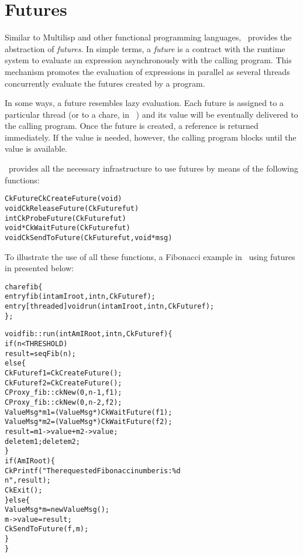 \section{Futures}
\label{futures}

Similar to Multilisp and other functional programming languages, \charmpp\ provides the abstraction of {\em futures}. In simple terms, a {\em future} is a contract with the runtime system to evaluate an expression asynchronously with the calling program. This mechanism promotes the evaluation of expressions in parallel as several threads concurrently evaluate the futures created by a program.

In some ways, a future resembles lazy evaluation. Each future is assigned to a particular thread (or to a chare, in \charmpp\ ) and its value will be eventually delivered to the calling program. Once the future is created, a reference is returned immediately. If the value is needed, however, the calling program blocks until the value is available.

\charmpp\ provides all the necessary infrastructure to use futures by means of the following functions: 

\begin{alltt}
 CkFuture CkCreateFuture(void)
 void CkReleaseFuture(CkFuture fut)
 int CkProbeFuture(CkFuture fut)
 void *CkWaitFuture(CkFuture fut)
 void  CkSendToFuture(CkFuture fut, void *msg)
\end{alltt}

To illustrate the use of all these functions, a Fibonacci example in \charmpp\ using futures in presented below:

\begin{alltt}
chare fib \{
  entry fib(int amIroot, int n, CkFuture f);
  entry  [threaded] void run(int amIroot, int n, CkFuture f);
\};
\end{alltt}

\begin{alltt}
void  fib::run(int AmIRoot, int n, CkFuture f) \{
   if (n< THRESHOLD)
    result =seqFib(n);
  else \{
    CkFuture f1 = CkCreateFuture();
    CkFuture f2 = CkCreateFuture();
    CProxy_fib::ckNew(0,n-1,  f1);
    CProxy_fib::ckNew(0,n-2,  f2);
    ValueMsg * m1 = (ValueMsg *) CkWaitFuture(f1);
    ValueMsg * m2 = (ValueMsg *) CkWaitFuture(f2);
    result = m1->value + m2->value;
    delete m1; delete m2;
  \}
  if (AmIRoot) \{
    CkPrintf("The requested Fibonacci number is : \%d\\n", result);
    CkExit();  
  \} else \{
    ValueMsg *m = new ValueMsg();
    m->value = result;
    CkSendToFuture(f, m); 
  \}
\}
\end{alltt}

